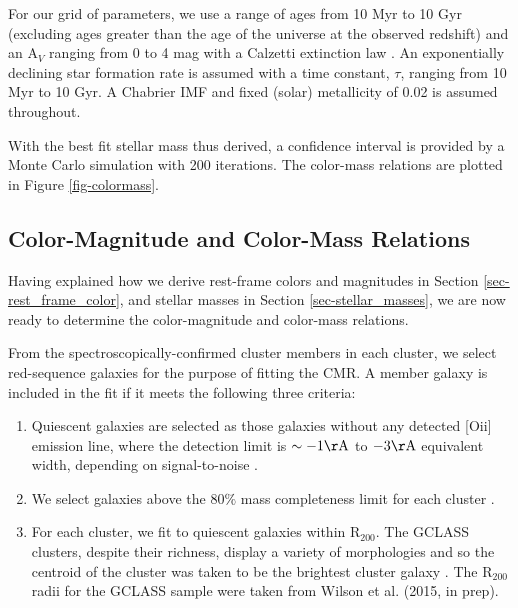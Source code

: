 For our grid of parameters, we use a range of ages from 10 Myr to 10 Gyr (excluding ages greater than the age of the universe at the observed redshift) and an A$_V$ ranging from 0 to 4 mag with a Calzetti extinction law \citep{Calzetti:2001hh}. An exponentially declining star formation rate is assumed with a time constant, $\tau$, ranging from 10 Myr to 10 Gyr. A Chabrier IMF \citep{chabrierimf} and fixed (solar) metallicity of 0.02 is assumed throughout.

With the best fit stellar mass thus derived, a confidence interval is provided by a Monte Carlo simulation with 200 iterations. The color-mass relations are plotted in Figure \ref{fig-colormass}.

\subsection{Color-Magnitude and Color-Mass Relations}\label{sec-fits}

Having explained how we derive rest-frame colors and magnitudes in Section \ref{sec-rest_frame_color}, and stellar masses in Section \ref{sec-stellar_masses}, we are now ready to determine the color-magnitude and color-mass relations.

From the spectroscopically-confirmed cluster members in each cluster, we select red-sequence galaxies for the purpose of fitting the CMR. A member galaxy is included in the fit if it meets the following three criteria:

\begin{enumerate}

\item
Quiescent galaxies are selected as those galaxies without any detected [O{\sc ii}] emission line, where the detection limit is $\sim -1 \mathrm{\AA}$ to $-3 \mathrm{\AA}$ equivalent width, depending on signal-to-noise \citep[see][]{Muzzin:2012dw}.

\item
We select galaxies above the $80\%$ mass completeness limit for each cluster \citep[calculated in][]{van-der-Burg:2013zn}.

\item
For each cluster, we fit to quiescent galaxies within R$_{200}$. The GCLASS clusters, despite their richness, display a variety of morphologies and so the centroid of the cluster was taken to be the brightest cluster galaxy \citep{Lidman:2012il}. The R$_{200}$ radii for the GCLASS sample were taken from Wilson et al. (2015, in prep).
\end{enumerate}

